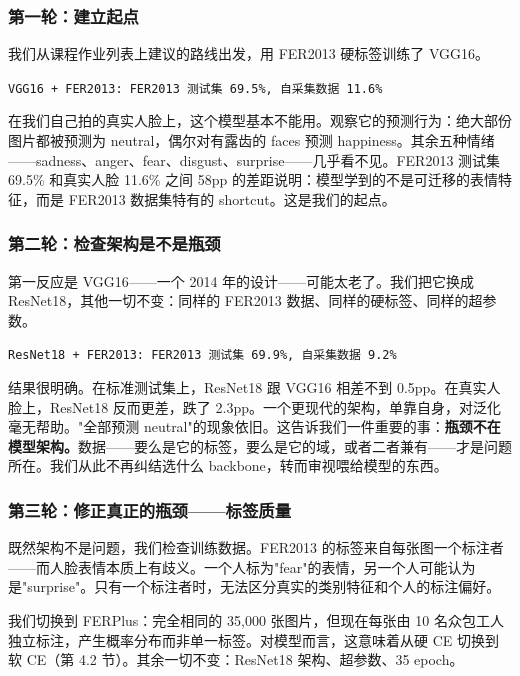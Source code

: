 \documentclass[12pt,a4paper]{ctexart}
\begin{document}
\subsubsection*{第一轮：建立起点}

我们从课程作业列表上建议的路线出发，用 FER2013 硬标签训练了 VGG16。

\begin{center}
\texttt{VGG16 + FER2013:  FER2013 测试集 69.5\%, 自采集数据 11.6\%}
\end{center}

在我们自己拍的真实人脸上，这个模型基本不能用。观察它的预测行为：绝大部份图片都被预测为 neutral，偶尔对有露齿的 faces 预测 happiness。其余五种情绪——sadness、anger、fear、disgust、surprise——几乎看不见。FER2013 测试集 69.5\% 和真实人脸 11.6\% 之间 58pp 的差距说明：模型学到的不是可迁移的表情特征，而是 FER2013 数据集特有的 shortcut。这是我们的起点。


\subsubsection*{第二轮：检查架构是不是瓶颈}

第一反应是 VGG16——一个 2014 年的设计——可能太老了。我们把它换成 ResNet18，其他一切不变：同样的 FER2013 数据、同样的硬标签、同样的超参数。

\begin{center}
\texttt{ResNet18 + FER2013:  FER2013 测试集 69.9\%, 自采集数据 9.2\%}
\end{center}

结果很明确。在标准测试集上，ResNet18 跟 VGG16 相差不到 0.5pp。在真实人脸上，ResNet18 反而更差，跌了 2.3pp。一个更现代的架构，单靠自身，对泛化毫无帮助。"全部预测 neutral"的现象依旧。这告诉我们一件重要的事：\textbf{瓶颈不在模型架构。}数据——要么是它的标签，要么是它的域，或者二者兼有——才是问题所在。我们从此不再纠结选什么 backbone，转而审视喂给模型的东西。


\subsubsection*{第三轮：修正真正的瓶颈——标签质量}

既然架构不是问题，我们检查训练数据。FER2013 的标签来自每张图一个标注者——而人脸表情本质上有歧义。一个人标为"fear"的表情，另一个人可能认为是"surprise"。只有一个标注者时，无法区分真实的类别特征和个人的标注偏好。

我们切换到 FERPlus：完全相同的 35,000 张图片，但现在每张由 10 名众包工人独立标注，产生概率分布而非单一标签。对模型而言，这意味着从硬 CE 切换到软 CE（第 4.2 节）。其余一切不变：ResNet18 架构、超参数、35 epoch。
\end{document}
